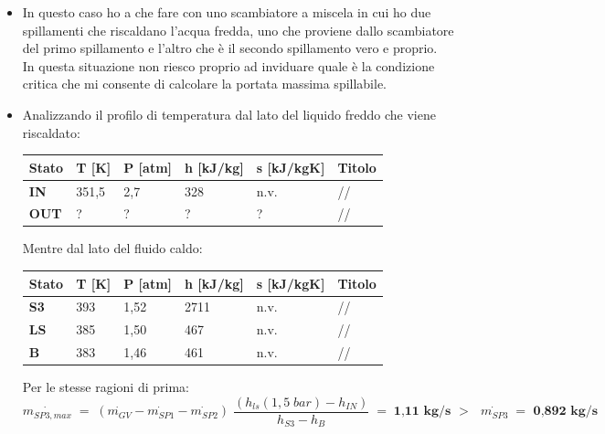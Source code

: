 \documentclass[a4paper, twoside, 12pt]{report}
\begin{document}
\begin{itemize}
	Quindi:
	\begin{equation}
		\dot{m_{SP1,max}}\;=\;	\dot{m_{GV}}\;\dfrac{(h_{ls}(8,5\;bar)-h_{3R})}{h_{S1}-h_{B}}\;=\;\textbf{1,50 kg/s $>$ $\dot{m_{SP1}}\;=$ 1,26 kg/s}
	\end{equation}
	\item[\textbf{2° Spillamento}] In questo caso ho a che fare con uno scambiatore a miscela in cui ho due spillamenti che riscaldano l'acqua fredda, uno che proviene dallo scambiatore del primo spillamento e l'altro che è il secondo spillamento vero e proprio.\\
	In questa situazione non riesco proprio ad inviduare quale è la condizione critica che mi consente di calcolare la portata massima spillabile.
	\item[\textbf{3° Spillamento}] Analizzando il profilo di temperatura dal lato del liquido freddo che viene riscaldato:
	\begin{center}
		\begin{tabular}{| l || l | l | l | l | l |}
			\hline
			\textbf{Stato} & \textbf{T [K]} & \textbf{P [atm]} & \textbf{h [kJ/kg]} & \textbf{s [kJ/kgK]} & \textbf{Titolo}\\ 
			\hline
			\textbf{IN} & 351,5 & 2,7 & 328 & n.v. & //\\
			\hline
			\textbf{OUT} & ? & ? & ? & ? & //\\
			\hline
		\end{tabular}
	\end{center}
	Mentre dal lato del fluido caldo:
	\begin{center}
		\begin{tabular}{| l || l | l | l | l | l |}
			\hline
			\textbf{Stato} & \textbf{T [K]} & \textbf{P [atm]} & \textbf{h [kJ/kg]} & \textbf{s [kJ/kgK]} & \textbf{Titolo}\\ 
			\hline
			\textbf{S3} & 393 & 1,52 & 2711 & n.v. & //\\
			\hline
			\textbf{LS} & 385 & 1,50 & 467 & n.v. & //\\
			\hline
			\textbf{B} & 383 & 1,46 & 461 & n.v. & //\\
			\hline
		\end{tabular}
	\end{center}
	Per le stesse ragioni di prima:
	\begin{equation}
		\dot{m_{SP3,max}}\;=\;	(\dot{m_{GV}}-\dot{m_{SP1}}-\dot{m_{SP2}})\;\dfrac{(h_{ls}(1,5\;bar)-h_{IN})}{h_{S3}-h_{B}}\;=\;\textbf{1,11 kg/s $>$ $\dot{m_{SP3}}\;=$ 0,892 kg/s}
	\end{equation}

\end{itemize}
\end{document}
